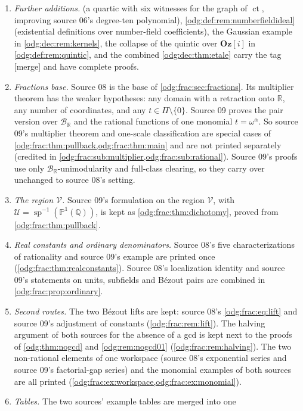 \documentclass[11pt,oneside]{article}
\numberwithin{equation}{section}
\theoremstyle{definition}
\theoremstyle{remark}
\newcommand{\Oz}{\mathbf{Oz}}
\newcommand{\Q}{\mathbb Q}
\newcommand{\R}{\mathbb R}
\newcommand{\BR}{\mathcal B_{\R}}
\newcommand{\ct}{\operatorname{ct}}
\newcommand{\mergetag}{\textup{\textsf{\small[merge]}}}
\newcommand{\Og}{\Oz[i]}
\newcommand{\spz}{\operatorname{sp}}
\newcommand{\Vreg}{\mathcal V}
\newcommand{\Ureg}{\mathcal U}
\begin{document}
\begin{enumerate}[leftmargin=*]
07's \cite{Conrad}).
\item \emph{Further additions.}  (a quartic with six
witnesses for the graph of $\ct$, improving source 06's degree-ten polynomial),
\cref{odg:def:rem:numberfieldideal} (existential definitions over number-field
coefficients), the Gaussian example in \cref{odg:dec:rem:kernels}, the collapse
of the quintic over $\Og$ in \cref{odg:def:rem:quintic}, and the combined
\cref{odg:dec:thm:etale} carry the tag \mergetag{} and have complete proofs.
\item \emph{Fractions base.} Source 08 is the base of
\cref{odg:frac:sec:fractions}. Its multiplier theorem has the weaker
hypotheses: any domain with a retraction onto $\R$, any number of coordinates,
and any $t\in\Pi\setminus\{0\}$. Source 09 proves the pair version over $\BR$
and the rational functions of one monomial $t=\omega^\alpha$. So source 09's
multiplier theorem and one-scale classification are special cases of
\cref{odg:frac:thm:pullback,odg:frac:thm:main} and are not printed separately
(credited in \cref{odg:frac:sub:multiplier,odg:frac:sub:rational}). Source 09's
proofs use only $\BR$-unimodularity and full-class clearing, so they carry
over unchanged to source 08's setting.
\item \emph{The region $\Vreg$.} Source 09's formulation on the region $\Vreg$,
with $\Ureg=\spz^{-1}(\mathbb P^1(\Q))$, is kept as
\cref{odg:frac:thm:dichotomy}, proved from \cref{odg:frac:thm:pullback}.
\item \emph{Real constants and ordinary denominators.} Source 08's five
characterizations of rationality and source 09's example are printed once
(\cref{odg:frac:thm:realconstants}). Source 08's localization identity and
source 09's statements on units, subfields and B\'ezout pairs are combined in
\cref{odg:frac:prop:ordinary}.
\item \emph{Second routes.} The two B\'ezout lifts are kept: source 08's
\eqref{odg:frac:eq:lift} and source 09's adjustment of constants
(\cref{odg:frac:rem:lift}). The halving argument of both sources for the
absence of a gcd is kept next to the proofs of \cref{odg:thm:nogcd} and
\cref{odg:rem:nogcd01} (\cref{odg:frac:rem:halving}). The two non-rational
elements of one workspace (source 08's exponential series and source 09's
factorial-gap series) and the monomial examples of both sources are all printed
(\cref{odg:frac:ex:workspace,odg:frac:ex:monomial}).
\item \emph{Tables.} The two sources' example tables are merged into one

\end{enumerate}
\end{document}
